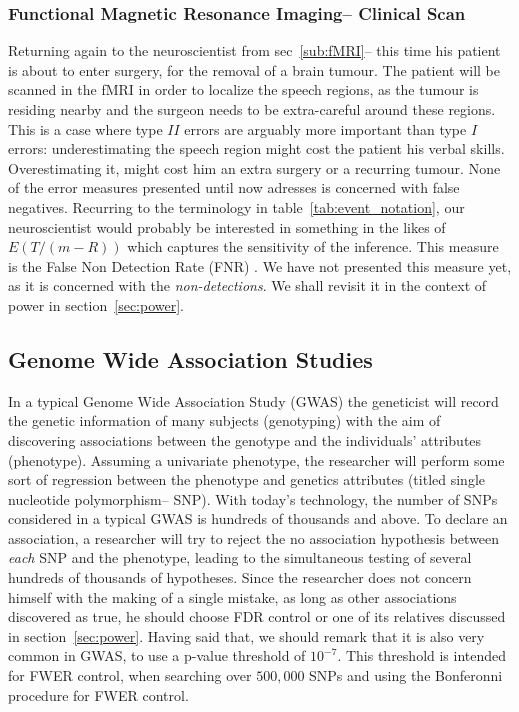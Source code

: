 \documentclass[review,12pt]{article}
\begin{document}
\subsubsection{Functional Magnetic Resonance Imaging-- Clinical Scan}
Returning again to the neuroscientist from sec~\ref{sub:fMRI}-- this time his patient is about to enter surgery, for the removal of a brain tumour. The patient will be scanned in the fMRI in order to localize the speech regions, as the tumour is residing nearby and the surgeon needs to be extra-careful around these regions. This is a case where type $II$ errors are arguably more important than type $I$ errors: underestimating the speech region might cost the patient his verbal skills. Overestimating it, might cost him an extra surgery or a recurring tumour. None of the error measures presented until now adresses is concerned with false negatives. Recurring to the terminology in table~\ref{tab:event_notation}, our neuroscientist would probably be interested in something in the likes of $E(T/(m-R))$ which captures the sensitivity of the inference. This measure is the False Non Detection Rate (FNR) \citep{genovese_operating_2002}. We have not presented this measure yet, as it is concerned with the \emph{non-detections}. We shall revisit it in the context of power in section~\ref{sec:power}. 




\subsection{Genome Wide Association Studies}
In a typical Genome Wide Association Study (GWAS) the geneticist will record the genetic information of many subjects (genotyping) with the aim of discovering associations between the genotype and the individuals' attributes (phenotype). Assuming a univariate phenotype, the researcher will perform some sort of regression between the phenotype and genetics attributes (titled single nucleotide polymorphism-- SNP). With today's technology, the number of SNPs considered in a typical GWAS is hundreds of thousands and above. To declare an association, a researcher will try to reject the no association hypothesis between \emph{each} SNP and the phenotype, leading to the simultaneous testing of several hundreds of thousands of hypotheses. 
Since the researcher does not concern himself with the making of a single mistake, as long as other associations discovered as true, he should choose FDR control or one of its relatives discussed in section~\ref{sec:power}. 
Having said that, we should remark that it is also very common in GWAS, to use a p-value threshold of $10^{-7}$. This threshold is intended for FWER control, when searching over $500,000$ SNPs and using the Bonferonni procedure \cite{bush_chapter_2012} for FWER control. 
\end{document}
